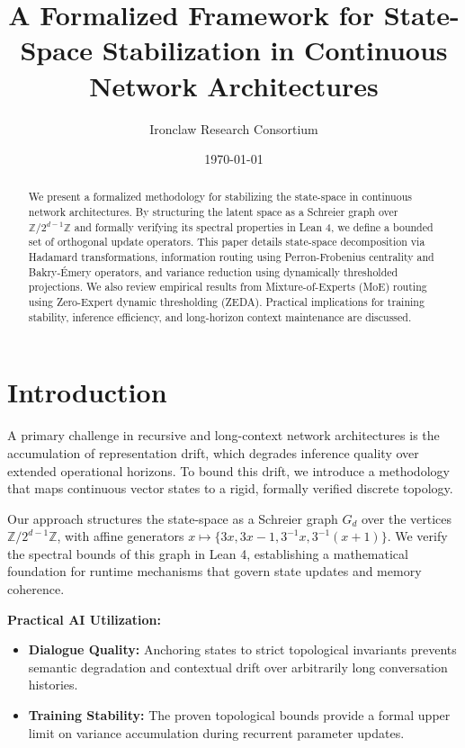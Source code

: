 \documentclass[11pt,a4paper]{article}
\title{A Formalized Framework for State-Space Stabilization in Continuous Network Architectures}
\author{Ironclaw Research Consortium}
\date{\today}
\begin{document}
\maketitle

\begin{abstract}
We present a formalized methodology for stabilizing the state-space in continuous network architectures. By structuring the latent space as a Schreier graph over $\mathbb{Z}/2^{d-1}\mathbb{Z}$ and formally verifying its spectral properties in Lean 4, we define a bounded set of orthogonal update operators. This paper details state-space decomposition via Hadamard transformations, information routing using Perron-Frobenius centrality and Bakry-\'Emery operators, and variance reduction using dynamically thresholded projections. We also review empirical results from Mixture-of-Experts (MoE) routing using Zero-Expert dynamic thresholding (ZEDA). Practical implications for training stability, inference efficiency, and long-horizon context maintenance are discussed.
\end{abstract}

\section{Introduction}
A primary challenge in recursive and long-context network architectures is the accumulation of representation drift, which degrades inference quality over extended operational horizons. To bound this drift, we introduce a methodology that maps continuous vector states to a rigid, formally verified discrete topology. 

Our approach structures the state-space as a Schreier graph $G_d$ over the vertices $\mathbb{Z}/2^{d-1}\mathbb{Z}$, with affine generators $x \mapsto \{3x, 3x-1, 3^{-1}x, 3^{-1}(x+1)\}$. We verify the spectral bounds of this graph in Lean 4, establishing a mathematical foundation for runtime mechanisms that govern state updates and memory coherence.

\textbf{Practical AI Utilization:}
\begin{itemize}
    \item \textbf{Dialogue Quality:} Anchoring states to strict topological invariants prevents semantic degradation and contextual drift over arbitrarily long conversation histories.
    \item \textbf{Training Stability:} The proven topological bounds provide a formal upper limit on variance accumulation during recurrent parameter updates.
\end{itemize}
\end{document}
